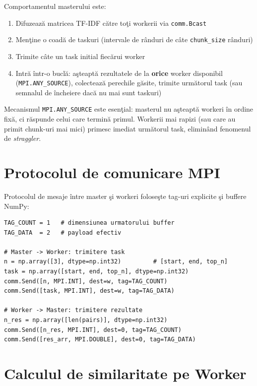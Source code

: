 \documentclass[a4paper,12pt]{report}
\begin{document}
Comportamentul masterului este:
\begin{enumerate}
  \item Difuzeaz\u{a} matricea TF-IDF c\u{a}tre to\c{t}i workerii via \texttt{comm.Bcast}
  \item Men\c{t}ine o coad\u{a} de taskuri (intervale de r\^{a}nduri de c\^{a}te \texttt{chunk\_size} r\^{a}nduri)
  \item Trimite c\^{a}te un task initial fiec\u{a}rui worker
  \item Intr\u{a} \^{i}ntr-o bucl\u{a}: a\c{s}teapt\u{a} rezultatele de la \textbf{orice} worker disponibil (\texttt{MPI.ANY\_SOURCE}), colecteaz\u{a} perechile g\u{a}site, trimite urm\u{a}torul task (sau semnalul de \^{i}ncheiere dac\u{a} nu mai sunt taskuri)
\end{enumerate}

Mecanismul \texttt{MPI.ANY\_SOURCE} este esen\c{t}ial: masterul nu a\c{s}teapt\u{a} workeri \^{i}n ordine fix\u{a}, ci r\u{a}spunde celui care termin\u{a} primul. Workerii mai rapizi (sau care au primit chunk-uri mai mici) primesc imediat urm\u{a}torul task, elimin\^{a}nd fenomenul de \textit{straggler}.

\section{Protocolul de comunicare MPI}

Protocolul de mesaje \^{i}ntre master \c{s}i workeri folose\c{s}te tag-uri explicite \c{s}i buffere NumPy:

\begin{lstlisting}[caption={Protocol mesaje Master-Worker (Python/mpi4py)}]
TAG_COUNT = 1   # dimensiunea urmatorului buffer
TAG_DATA  = 2   # payload efectiv

# Master -> Worker: trimitere task
n = np.array([3], dtype=np.int32)         # [start, end, top_n]
task = np.array([start, end, top_n], dtype=np.int32)
comm.Send([n, MPI.INT], dest=w, tag=TAG_COUNT)
comm.Send([task, MPI.INT], dest=w, tag=TAG_DATA)

# Worker -> Master: trimitere rezultate
n_res = np.array([len(pairs)], dtype=np.int32)
comm.Send([n_res, MPI.INT], dest=0, tag=TAG_COUNT)
comm.Send([res_arr, MPI.DOUBLE], dest=0, tag=TAG_DATA)
\end{lstlisting}

\section{Calculul de similaritate pe Worker}
\end{document}
